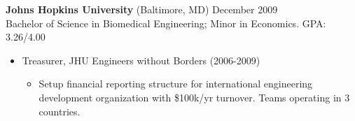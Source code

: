 \documentclass[margin]{res}
\newcommand{\locdatesubsection}[3]{\textbf{#1} (#2) \hfill #3}
\begin{document}
\begin{sloppypar}
\begin{resume}




\locdatesubsection{Johns Hopkins University}{Baltimore, MD}{December 2009}\\
Bachelor of Science in Biomedical Engineering; Minor in Economics. GPA: 3.26/4.00
\begin{itemize}
\item Treasurer, JHU Engineers without Borders (2006-2009)
    \begin{itemize}
        \item Setup financial reporting structure for international engineering development organization with \$100k/yr turnover. Teams operating in 3 countries.
    \end{itemize}
\end{itemize}


\end{resume}
\end{sloppypar}
\end{document}
